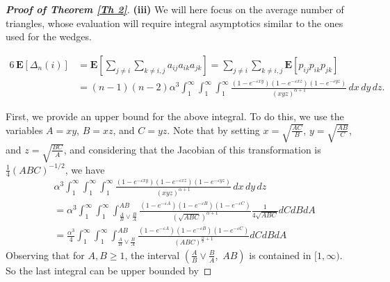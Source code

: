 \documentclass[11pt, reqno]{amsart}
\numberwithin{equation}{section}
\theoremstyle{plain} %
\theoremstyle{definition} %
\newcommand{\eps}{\varepsilon}
\newcommand{\prob}{\mathbf{P}}
\newcommand{\E}{\mathbf{E}}
\newcommand{\revise}[1]{{\color{black}#1}}
\begin{document}
\begin{proof}[{\bf Proof of Theorem \ref{Th 2}}]

{\bf (iii)} We will here focus on the average number of triangles, whose evaluation will require integral asymptotics similar to the ones used for the wedges.

\begin{equation}
\begin{split}
    6 \, \mathbf{E}\left[\Delta_n(i)\right] &= \mathbf{E}\left[ \sum_{j \neq i} \sum_{k \neq i,j} a_{ij} a_{ik}a_{jk}  \right] =  \sum_{j \neq i} \sum_{k \neq i,j} \E\left[  p_{ij} p_{ik}  p_{jk}  \right] \\
    &= (n-1) (n-2) \alpha^3  \int_1^{\infty} \int_1^{\infty}  \int_1^{\infty}  \frac{(1-e^{-\eps x y}) (1-e^{-\eps x z})(1-e^{-\eps yz}) }{(xyz)^{\alpha +1}}\, dx\, dy \, dz.
\end{split}
\end{equation}
\revise{
First, we provide an upper bound for the above integral. To do this, we use the variables \( A = xy \), \( B = xz \), and \( C = yz \). Note that by setting \( x = \sqrt{\frac{AC}{B}} \), \( y = \sqrt{\frac{AB}{C}} \), and \( z = \sqrt{\frac{BC}{A}} \), and considering that the Jacobian of this transformation is \( \frac{1}{4} (ABC)^{-1/2} \), we have
\[
\begin{split}
& \alpha^3  \int_1^{\infty} \int_1^{\infty}  \int_1^{\infty}  \frac{(1-e^{-\eps x y}) (1-e^{-\eps x z})(1-e^{-\eps yz}) }{(xyz)^{\alpha +1}}\, dx\, dy \, dz\\
 &= \alpha^3 \int_1^{\infty} \int_1^{\infty} \int_{\frac{A}{B}\vee \frac{B}{A}}^{AB} \frac{(1-e^{-\eps A}) (1-e^{-\eps B})(1-e^{-\eps C}) }{(\sqrt{ABC})^{\alpha +1}} \frac{1}{4\sqrt{ABC}}dC dB dA\\
 &=\frac{\alpha^3}{4} \int_1^{\infty} \int_1^{\infty} \int_{\frac{A}{B}\vee \frac{B}{A}}^{AB} \frac{(1-e^{-\eps A}) (1-e^{-\eps B})(1-e^{-\eps C}) }{(ABC)^{\frac{\alpha}{2} +1}} dC dB dA
\end{split}
\]
Observing that for $A, B\ge 1$, the interval $\left(\frac{A}{B}\vee \frac{B}{A}, \,\, AB\right)$ is contained in $[1,\infty)$. So the last integral can be upper bounded by

}
\end{proof}
\end{document}
